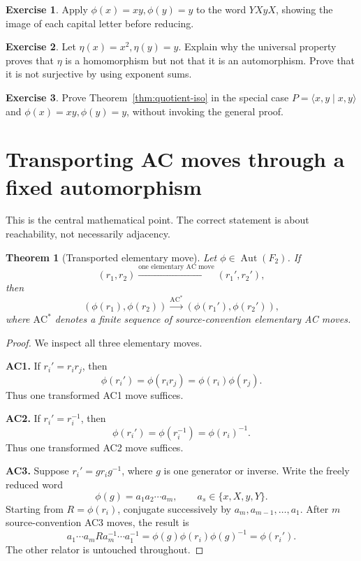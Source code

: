\documentclass[11pt]{article}
\newtheorem{theorem}{Theorem}[section]
\theoremstyle{definition}
\newtheorem{exercise}{Exercise}[section]
\theoremstyle{remark}
\newcommand{\F}{F_2}
\newcommand{\Aut}{\operatorname{Aut}}
\newcommand{\AC}{\mathrm{AC}}
\begin{document}
\begin{exercise}
Apply \(\phi(x)=xy,\phi(y)=y\) to the word \(YXyX\), showing the image of
each capital letter before reducing.
\end{exercise}

\begin{exercise}
Let \(\eta(x)=x^2,\eta(y)=y\).  Explain why the universal property proves
that \(\eta\) is a homomorphism but not that it is an automorphism.  Prove
that it is not surjective by using exponent sums.
\end{exercise}

\begin{exercise}
Prove Theorem~\ref{thm:quotient-iso} in the special case
\(P=\langle x,y\mid x,y\rangle\) and
\(\phi(x)=xy,\phi(y)=y\), without invoking the general proof.
\end{exercise}

\section{Transporting AC moves through a fixed automorphism}
\label{sec:transport}

This is the central mathematical point.  The correct statement is about
reachability, not necessarily adjacency.

\begin{theorem}[Transported elementary move]
\label{thm:one-move}
Let \(\phi\in\Aut(\F)\).  If
\[
  (r_1,r_2)\xrightarrow{\text{one elementary AC move}}(r_1',r_2'),
\]
then
\[
  (\phi(r_1),\phi(r_2))
  \xrightarrow{\AC^*}
  (\phi(r_1'),\phi(r_2')),
\]
where \(\AC^*\) denotes a finite sequence of source-convention elementary
AC moves.
\end{theorem}

\begin{proof}
We inspect all three elementary moves.

\textbf{AC1.}  If \(r_i'=r_i r_j\), then
\[
  \phi(r_i')=\phi(r_i r_j)=\phi(r_i)\phi(r_j).
\]
Thus one transformed AC1 move suffices.

\textbf{AC2.}  If \(r_i'=r_i^{-1}\), then
\[
  \phi(r_i')=\phi(r_i^{-1})=\phi(r_i)^{-1}.
\]
Thus one transformed AC2 move suffices.

\textbf{AC3.}  Suppose \(r_i'=g r_i g^{-1}\), where \(g\) is one generator
or inverse.  Write the freely reduced word
\[
  \phi(g)=a_1a_2\cdots a_m,
  \qquad a_s\in\{x,X,y,Y\}.
\]
Starting from \(R=\phi(r_i)\), conjugate successively by
\(a_m,a_{m-1},\ldots,a_1\).  After \(m\) source-convention AC3 moves, the
result is
\[
  a_1\cdots a_m R a_m^{-1}\cdots a_1^{-1}
  =\phi(g)\phi(r_i)\phi(g)^{-1}
  =\phi(r_i').
\]
The other relator is untouched throughout.
\end{proof}
\end{document}

